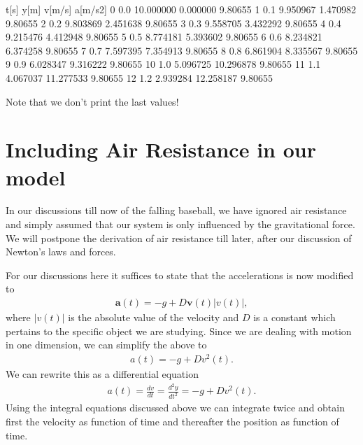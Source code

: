 \documentclass[letterpaper,10pt,english]{sphinxmanual}
\begin{document}
\begin{sphinxVerbatim}[commandchars=\\\{\}]
    t[s]       y[m]     v[m/s]  a[m/s\PYGZca{}2]
0    0.0  10.000000   0.000000  \PYGZhy{}9.80655
1    0.1   9.950967  \PYGZhy{}1.470982  \PYGZhy{}9.80655
2    0.2   9.803869  \PYGZhy{}2.451638  \PYGZhy{}9.80655
3    0.3   9.558705  \PYGZhy{}3.432292  \PYGZhy{}9.80655
4    0.4   9.215476  \PYGZhy{}4.412948  \PYGZhy{}9.80655
5    0.5   8.774181  \PYGZhy{}5.393602  \PYGZhy{}9.80655
6    0.6   8.234821  \PYGZhy{}6.374258  \PYGZhy{}9.80655
7    0.7   7.597395  \PYGZhy{}7.354913  \PYGZhy{}9.80655
8    0.8   6.861904  \PYGZhy{}8.335567  \PYGZhy{}9.80655
9    0.9   6.028347  \PYGZhy{}9.316222  \PYGZhy{}9.80655
10   1.0   5.096725 \PYGZhy{}10.296878  \PYGZhy{}9.80655
11   1.1   4.067037 \PYGZhy{}11.277533  \PYGZhy{}9.80655
12   1.2   2.939284 \PYGZhy{}12.258187  \PYGZhy{}9.80655
\end{sphinxVerbatim}

Note that we don’t print the last values!


\section{Including Air Resistance in our model}
\label{\detokenize{chapter1:including-air-resistance-in-our-model}}
In our discussions till now of the falling baseball, we have ignored
air resistance and simply assumed that our system is only influenced
by the gravitational force.  We will postpone the derivation of air
resistance till later, after our discussion of Newton’s laws and
forces.

For our discussions here it suffices to state that the accelerations is now modified to
\begin{equation*}
\begin{split}
\boldsymbol{a}(t) = -g +D\boldsymbol{v}(t)\vert v(t)\vert,
\end{split}
\end{equation*}
where \(\vert v(t)\vert\) is the absolute value of the velocity and \(D\) is a constant which pertains to the specific object we are studying.
Since we are dealing with motion in one dimension, we can simplify the above to
\begin{equation*}
\begin{split}
a(t) = -g +Dv^2(t).
\end{split}
\end{equation*}
We can rewrite this as a differential equation
\begin{equation*}
\begin{split}
a(t) = \frac{dv}{dt}=\frac{d^2y}{dt^2}= -g +Dv^2(t).
\end{split}
\end{equation*}
Using the integral equations discussed above we can integrate twice
and obtain first the velocity as function of time and thereafter the
position as function of time.
\end{document}
